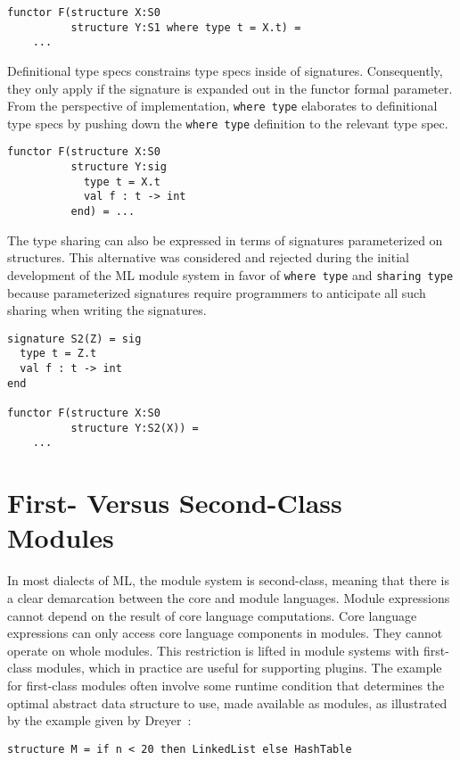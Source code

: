 \begin{lstlisting}
functor F(structure X:S0
	      structure Y:S1 where type t = X.t) = 
	...	
\end{lstlisting}

Definitional type specs constrains type specs inside of signatures. Consequently, they only apply if the signature is expanded out in the functor formal parameter. From the perspective of implementation, \lstinline{where type} elaborates to definitional type specs by pushing down the \lstinline{where type} definition to the relevant type spec. 

\begin{lstlisting}
functor F(structure X:S0
	      structure Y:sig 
	        type t = X.t
	        val f : t -> int
	      end) = ...	
\end{lstlisting}

The type sharing can also be expressed in terms of signatures parameterized on structures. This alternative was considered and rejected during the initial development of the ML module system in favor of \lstinline{where type} and \lstinline{sharing type} because parameterized signatures require programmers to anticipate all such sharing when writing the signatures. 

\begin{lstlisting}
signature S2(Z) = sig
  type t = Z.t
  val f : t -> int
end

functor F(structure X:S0
	      structure Y:S2(X)) = 
	...	
\end{lstlisting}

\section{First- Versus Second-Class Modules}
In most dialects of ML, the module system is second-class, meaning that there is a clear demarcation between the core and module languages. Module expressions cannot depend on the result of core language computations. Core language expressions can only access core language components in modules. They cannot operate on whole modules. This restriction is lifted in module systems with first-class modules, which in practice are useful for supporting plugins. The example for first-class modules often involve some runtime condition that determines the optimal abstract data structure to use, made available as modules, as illustrated by the example given by Dreyer~\cite{dreyerthesis}: 
~
\begin{lstlisting}
structure M = if n < 20 then LinkedList else HashTable	
\end{lstlisting}


